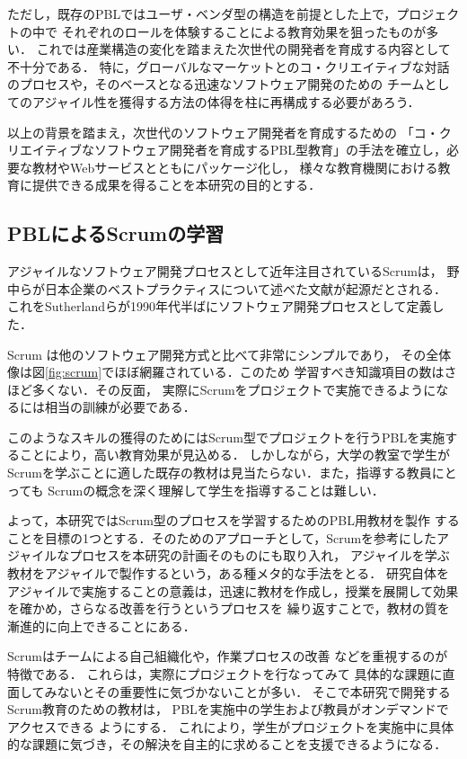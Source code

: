 \documentclass[a4j,9pt,twocolumn,twoside]{jsarticle}
\begin{document}
    ただし，既存のPBLではユーザ・ベンダ型の構造を前提とした上で，プロジェクトの中で
    それぞれのロールを体験することによる教育効果を狙ったものが多い．
    これでは産業構造の変化を踏まえた次世代の開発者を育成する内容として不十分である．
    特に，グローバルなマーケットとのコ・クリエイティブな対話のプロセスや，そのベースとなる迅速なソフトウェア開発のための
    チームとしてのアジャイル性を獲得する方法の体得を柱に再構成する必要があろう．
    
    以上の背景を踏まえ，次世代のソフトウェア開発者を育成するための
    「コ・クリエイティブなソフトウェア開発者を育成するPBL型教育」の手法を確立し，必要な教材やWebサービスとともにパッケージ化し，
    様々な教育機関における教育に提供できる成果を得ることを本研究の目的とする．

\subsection{PBLによるScrumの学習}
	アジャイルなソフトウェア開発プロセスとして近年注目されているScrumは，
	野中らが日本企業のベストプラクティスについて述べた文献\cite{nonaka}が起源だとされる．
	これをSutherlandらが1990年代半ばにソフトウェア開発プロセスとして定義した．
	
	Scrum は他のソフトウェア開発方式と比べて非常にシンプルであり，
	その全体像は図\ref{fig:scrum}でほぼ網羅されている．このため
	学習すべき知識項目の数はさほど多くない．その反面，
	実際にScrumをプロジェクトで実施できるようになるには相当の訓練が必要である．

	このようなスキルの獲得のためにはScrum型でプロジェクトを行うPBLを実施することにより，高い教育効果が見込める．
	しかしながら，大学の教室で学生がScrumを学ぶことに適した既存の教材は見当たらない．また，指導する教員にとっても
	Scrumの概念を深く理解して学生を指導することは難しい．

	よって，本研究ではScrum型のプロセスを学習するためのPBL用教材を製作
	することを目標の1つとする．そのためのアプローチとして，Scrumを参考にしたアジャイルなプロセスを本研究の計画そのものにも取り入れ，
	アジャイルを学ぶ教材をアジャイルで製作するという，ある種メタ的な手法をとる．
	研究自体をアジャイルで実施することの意義は，迅速に教材を作成し，授業を展開して効果を確かめ，さらなる改善を行うというプロセスを
	繰り返すことで，教材の質を漸進的に向上できることにある．
	
	Scrumはチームによる自己組織化や，作業プロセスの改善
	などを重視するのが特徴である．
	これらは，実際にプロジェクトを行なってみて
	具体的な課題に直面してみないとその重要性に気づかないことが多い．
	そこで本研究で開発するScrum教育のための教材は，
	PBLを実施中の学生および教員がオンデマンドでアクセスできる
	ようにする．
	これにより，学生がプロジェクトを実施中に具体的な課題に気づき，その解決を自主的に求めることを支援できるようになる．
	
\end{document}
